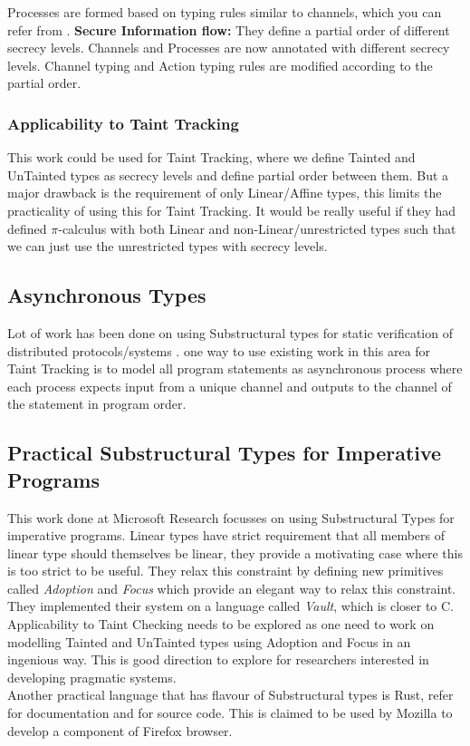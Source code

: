\documentclass[11pt, pdftex]{article}
\begin{document}
Processes are formed based on typing rules similar to channels, which you can refer from \cite{honda2002uniform}. 
\textbf{Secure Information flow:} They define a partial order of different secrecy levels. Channels and Processes are now annotated with different secrecy levels. Channel typing and Action typing rules are modified according to the partial order. 

\subsubsection{Applicability to Taint Tracking}
This work could be used for Taint Tracking, where we define Tainted and UnTainted types as secrecy levels and define partial order between them. But a major drawback is the requirement of only Linear/Affine types, this limits the practicality of using this for Taint Tracking. It would be really useful if they had defined $\pi$-calculus with both Linear and non-Linear/unrestricted types such that we can just use the unrestricted types with secrecy levels.

\subsection{Asynchronous Types}
Lot of work has been done on using Substructural types for static verification of distributed protocols/systems \cite{gay2010linear} \cite{mazurak2010lolliproc} \cite{tov2012practical}. one way to use existing work in this area for Taint Tracking is to model all program statements as asynchronous process where each process expects input from a unique channel and outputs to the channel of the statement in program order.

\subsection{Practical Substructural Types for Imperative Programs}
This work done at Microsoft Research\cite{fahndrich2002adoption} focusses on using Substructural Types for imperative programs. Linear types have strict requirement that all members of linear type should themselves be linear, they provide a motivating case where this is too strict to be useful. They relax this constraint by defining new primitives called \textit{Adoption } and \textit{ Focus} which provide an elegant way to relax this constraint. They implemented their system on a language called \textit{Vault}, which is closer to C. Applicability to Taint Checking needs to be explored as one need to work on modelling Tainted and UnTainted types using Adoption and Focus in an ingenious way. This is good direction to explore for researchers interested in developing pragmatic systems.\\
Another practical language that has flavour of Substructural types is Rust\cite{rust}, refer \cite{rustdoc} for documentation and \cite{rustgit} for source code. This is claimed to be used by Mozilla to develop a component of Firefox browser.
\end{document}
